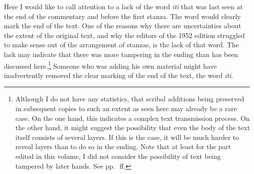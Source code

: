 Here I would like to call attention to a lack of the word \emph{iti} that was last seen at the end of the commentary and before the first stanza. The word would  clearly mark the end of the text. One of the reasons why there are uncertainties about the extent of the original text, and why the editors of the 1952 edition struggled to make sense out of the arrangement of stanzas, is the lack of that word. The lack may indicate that there was more tampering in the ending than has been discussed here.\footnote{Although I do not have any statistics, that scribal additions being preserved in subsequent copies to such an extent as seen here may already be a rare case. On the one hand, this indicates a complex text transmission process. On the other hand, it might suggest the possibility that even the body of the text itself consists of several layers. If this is the case, it will be much harder to reveal layers than to do so in the ending. Note that at least for the part edited in this volume, I did not consider the possibility of text being tampered by later hands. See pp.~\pageref{what_text}\,ff.} Someone who was adding his own material might have inadvertently removed the clear marking of the end of the text, the word \emph{iti}.


